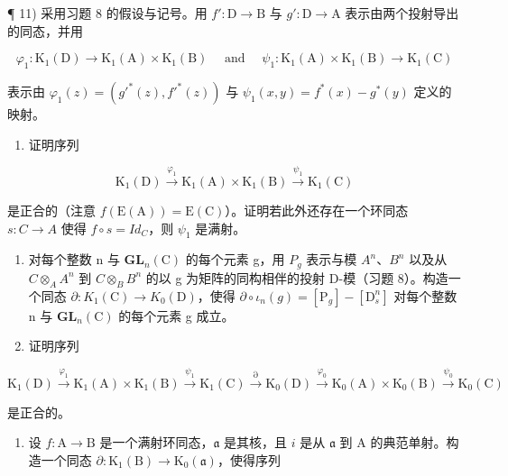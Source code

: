 ¶ 11) 采用习题 8 的假设与记号。用 \(f': \mathrm{D} \to \mathrm{B}\) 与 \(g': \mathrm{D} \to \mathrm{A}\) 表示由两个投射导出的同态，并用

\[
\varphi_ {1}: \mathrm{K} _ {1} (\mathrm{D}) \rightarrow \mathrm{K} _ {1} (\mathrm{A}) \times \mathrm{K} _ {1} (\mathrm{B}) \quad \text { and } \quad \psi_ {1}: \mathrm{K} _ {1} (\mathrm{A}) \times \mathrm{K} _ {1} (\mathrm{B}) \rightarrow \mathrm{K} _ {1} (\mathrm{C})
\]

表示由 \(\varphi_1(z) = (g'^* (z), f'^* (z))\) 与 \(\psi_1(x,y) = f^* (x) - g^* (y)\) 定义的映射。

\begin{enumerate}
\def\labelenumi{\alph{enumi})}
\tightlist
\item
  证明序列
\end{enumerate}

\[
\mathrm{K} _ {1} (\mathrm{D}) \xrightarrow {\varphi_ {1}} \mathrm{K} _ {1} (\mathrm{A}) \times \mathrm{K} _ {1} (\mathrm{B}) \xrightarrow {\psi_ {1}} \mathrm{K} _ {1} (\mathrm{C})
\]

是正合的（注意 \(f(\mathrm{E}(\mathrm{A})) = \mathrm{E}(\mathrm{C})\)）。证明若此外还存在一个环同态 \(s : C \to A\) 使得 \(f \circ s = Id_{C}\)，则 \(\psi_{1}\) 是满射。

\begin{enumerate}
\def\labelenumi{\alph{enumi})}
\setcounter{enumi}{1}
\item
  对每个整数 n 与 \(\mathbf{GL}_{n}(\mathrm{C})\) 的每个元素 g，用 \(P_{g}\) 表示与模 \(A^{n}\)、\(B^{n}\) 以及从 \(C \otimes_{A} A^{n}\) 到 \(C \otimes_{B} B^{n}\) 的以 g 为矩阵的同构相伴的投射 D-模（习题 8）。构造一个同态 \(\partial : K_{1}(\mathrm{C}) \to K_{0}(\mathrm{D})\)，使得 \(\partial \circ \iota_{n}(g) = [\mathrm{P}_{g}] - [\mathrm{D}_{s}^{n}]\) 对每个整数 n 与 \(\mathbf{GL}_{n}(\mathrm{C})\) 的每个元素 g 成立。
\item
  证明序列
\end{enumerate}

\[
\mathrm{K} _ {1} (\mathrm{D}) \xrightarrow {\varphi_ {1}} \mathrm{K} _ {1} (\mathrm{A}) \times \mathrm{K} _ {1} (\mathrm{B}) \xrightarrow {\psi_ {1}} \mathrm{K} _ {1} (\mathrm{C}) \xrightarrow {\partial} \mathrm{K} _ {0} (\mathrm{D}) \xrightarrow {\varphi_ {0}} \mathrm{K} _ {0} (\mathrm{A}) \times \mathrm{K} _ {0} (\mathrm{B}) \xrightarrow {\psi_ {0}} \mathrm{K} _ {0} (\mathrm{C})
\]

是正合的。

\begin{enumerate}
\def\labelenumi{\arabic{enumi})}
\setcounter{enumi}{11}
\tightlist
\item
  设 \(f: \mathrm{A} \to \mathrm{B}\) 是一个满射环同态，\(\mathfrak{a}\) 是其核，且 \(i\) 是从 \(\mathfrak{a}\) 到 \(\mathrm{A}\) 的典范单射。构造一个同态 \(\partial: \mathrm{K}_1(\mathrm{B}) \to \mathrm{K}_0(\mathfrak{a})\)，使得序列
\end{enumerate}

